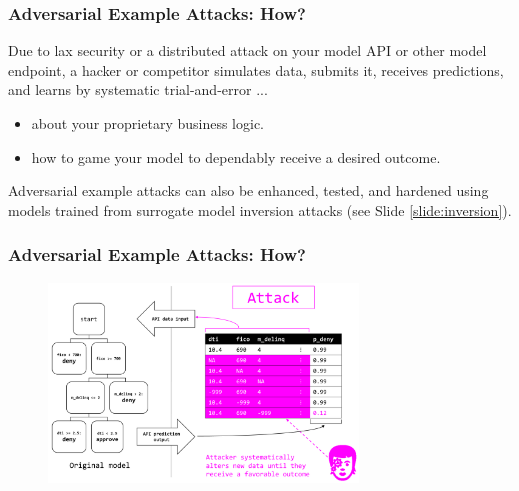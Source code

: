 \documentclass[11pt,
               aspectratio=169,
               hyperref={colorlinks}
               ]{beamer}
\begin{document}
			\begin{frame}
		
				\frametitle{Adversarial Example Attacks: \textbf{How?}}		

Due to lax security or a distributed attack on your model API or other model endpoint, a hacker or competitor simulates data, submits it, receives predictions, and learns by systematic trial-and-error ... 		
				\begin{itemize}
					\item about your proprietary business logic.
					\item how to game your model to dependably receive a desired outcome. 
				\end{itemize}
				\vspace{10pt}
Adversarial example attacks can also be enhanced, tested, and hardened using models trained from surrogate model inversion attacks (see Slide \ref{slide:inversion}).

			\end{frame}	
	
			\begin{frame}[label={slide:adversary}]
		
				\frametitle{Adversarial Example Attacks: \textbf{How?}}		
			
				\begin{figure}[htb]
					\begin{center}
						\includegraphics[height=150pt]{img/adversary.PNG}
					\end{center}
				\end{figure}	

			\end{frame}	
			
\end{document}
